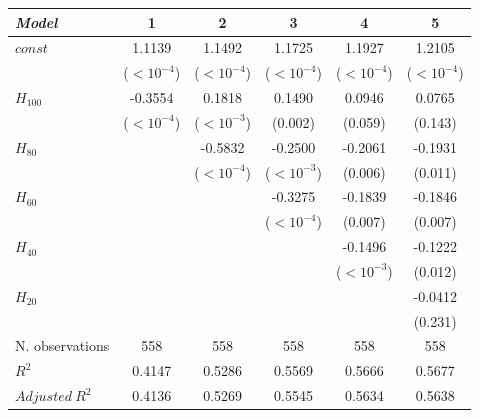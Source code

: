 \begin{tabular}{lccccc}
\toprule
\textit{Model} & 1 & 2 & 3 & 4 & 5 \\
\midrule
$\mathit{const}$ & 1.1139 & 1.1492 & 1.1725 & 1.1927 & 1.2105 \\
 & {\scriptsize ($<10^{-4}$)} & {\scriptsize ($<10^{-4}$)} & {\scriptsize ($<10^{-4}$)} & {\scriptsize ($<10^{-4}$)} & {\scriptsize ($<10^{-4}$)} \\
$H_{100}$ & -0.3554 & 0.1818 & 0.1490 & 0.0946 & 0.0765 \\
 & {\scriptsize ($<10^{-4}$)} & {\scriptsize ($<10^{-3}$)} & {\scriptsize (0.002)} & {\scriptsize (0.059)} & {\scriptsize (0.143)} \\
$H_{80}$ &  & -0.5832 & -0.2500 & -0.2061 & -0.1931 \\
 &  & {\scriptsize ($<10^{-4}$)} & {\scriptsize ($<10^{-3}$)} & {\scriptsize (0.006)} & {\scriptsize (0.011)} \\
$H_{60}$ &  &  & -0.3275 & -0.1839 & -0.1846 \\
 &  &  & {\scriptsize ($<10^{-4}$)} & {\scriptsize (0.007)} & {\scriptsize (0.007)} \\
$H_{40}$ &  &  &  & -0.1496 & -0.1222 \\
 &  &  &  & {\scriptsize ($<10^{-3}$)} & {\scriptsize (0.012)} \\
$H_{20}$ &  &  &  &  & -0.0412 \\
 &  &  &  &  & {\scriptsize (0.231)} \\
\midrule
N. observations & 558 & 558 & 558 & 558 & 558 \\
$R^2$ & 0.4147 & 0.5286 & 0.5569 & 0.5666 & 0.5677 \\
$\mathit{Adjusted}~R^2$ & 0.4136 & 0.5269 & 0.5545 & 0.5634 & 0.5638 \\
\bottomrule
\end{tabular}
